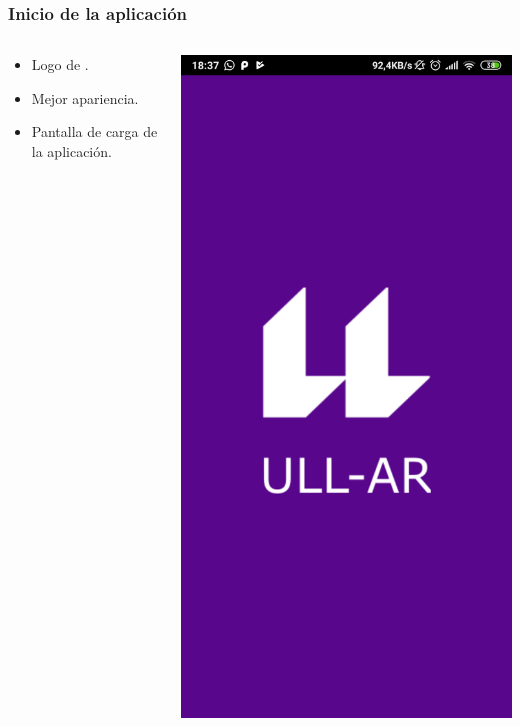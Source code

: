 \begin{frame}
	\frametitle{Inicio de la aplicación}
	\begin{columns}
		\begin{column}{0.6\textwidth}
			\begin{itemize}
				\item Logo de \ULLAR{}.
				\item Mejor apariencia.
				\item Pantalla de carga de la aplicación.
			\end{itemize}
			\endblock{}
		\end{column}
		\begin{column}{0.4\textwidth}
			\vfill 
			\begin{center}
				\includegraphics[width=0.7\linewidth]{Images/splashApp}
			\end{center}
		\end{column}
	\end{columns}
\end{frame}

